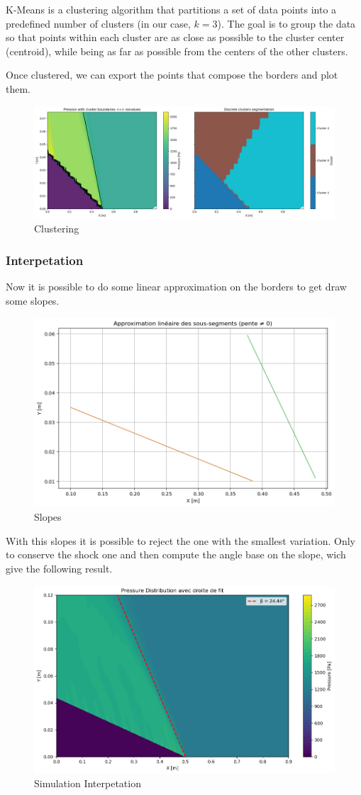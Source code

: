 K-Means is a clustering algorithm that partitions a set of data points into a predefined number of clusters (in our case, $k=3$). The goal is to group the data so that points within each cluster are as close as possible to the cluster center (centroid), while being as far as possible from the centers of the other clusters.

Once clustered, we can export the points that compose the borders and plot them.

\begin{figure}[H]
	\centering
	\includegraphics[width=0.8\linewidth]{ressources/figures/Kmeans.png}
	\caption{Clustering}
	\label{fig:clustering}
\end{figure}


\subsubsection{Interpetation}

Now it is possible to do some linear approximation on the borders to get draw some slopes.

\begin{figure}[H]
	\centering
	\includegraphics[width=0.5\linewidth]{ressources/figures/slope.png}
	\caption{Slopes}
	\label{fig:slopes}
\end{figure}

With this slopes it is possible to reject the one with the smallest variation. Only to conserve the shock one and then compute the angle base on the slope, wich give the following result.

\begin{figure}[H]
	\centering
	\includegraphics[width=0.5\linewidth]{ressources/figures/final_slope.png}
	\caption{Simulation Interpetation}
	\label{fig:interpetation}
\end{figure}


